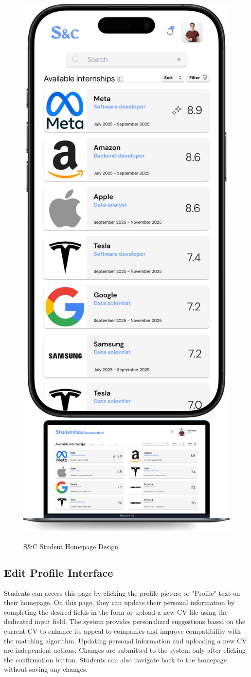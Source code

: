 \begin{figure}[H]
    \centering
    \includegraphics[width=0.2\linewidth]{Images/Mock-up/mobile homepage student.png}
    \includegraphics[width=0.75\linewidth]{Images/Mock-up/homepage student.png}
    \caption{S\&C Student Homepage Design}
    \label{fig:homepage-design}
\end{figure}
    

\subsection{Edit Profile Interface}

Students can access this page by clicking the profile picture or "Profile" text on their homepage. On this page, they can update their personal information by completing the desired fields in the form or upload a new CV file using the dedicated input field. The system provides personalized suggestions based on the current CV to enhance its appeal to companies and improve compatibility with the matching algorithm. Updating personal information and uploading a new CV are independent actions. Changes are submitted to the system only after clicking the confirmation button. Students can also navigate back to the homepage without saving any changes. \\

